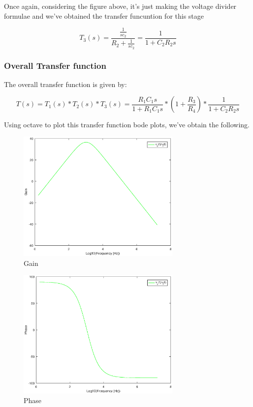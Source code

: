 Once again, considering the figure above, it's just making the voltage divider formulae and we've obtained the transfer funcuntion for this stage

\begin{equation}
T_3(s) = \frac{\frac{1}{sc_2}}{R_2 + \frac{1}{sc_2}} = \frac{1}{1+ C_2R_2s}
\end{equation} 

\subsubsection{Overall Transfer function}

The overall transfer function is given by:

\begin{equation}
T(s) = T_1(s)*T_2(s)*T_3(s) = \frac{R_1C_1s}{1+R_1C_1s}*(1 + \frac{R_3}{R_4})*\frac{1}{1+ C_2R_2s}
\end{equation} 

Using octave to plot this transfer function bode plots, we've obtain the following.

\begin{figure}[H] 
\centering
\includegraphics[width = 8cm]{gain.eps} 
\caption{Gain}
\label{gain}
\end{figure}

\begin{figure}[H] 
\centering
\includegraphics[width = 8cm]{phase.eps} 
\caption{Phase}
\label{phase}
\end{figure}

